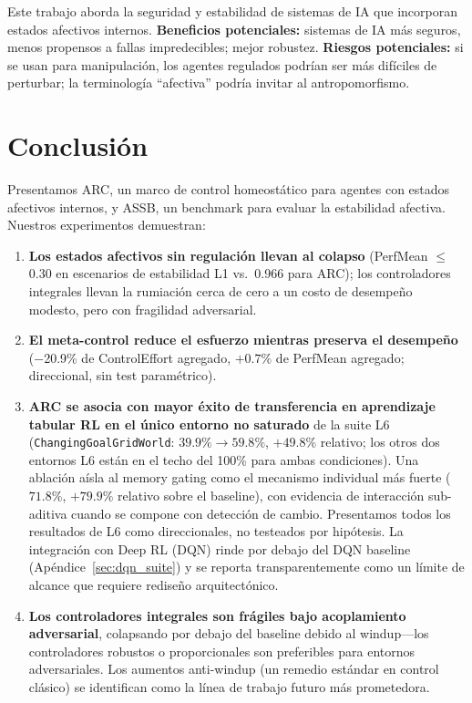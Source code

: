\documentclass{article}
\begin{document}
Este trabajo aborda la seguridad y estabilidad de sistemas de IA que incorporan estados afectivos internos. \textbf{Beneficios potenciales:} sistemas de IA más seguros, menos propensos a fallas impredecibles; mejor robustez. \textbf{Riesgos potenciales:} si se usan para manipulación, los agentes regulados podrían ser más difíciles de perturbar; la terminología ``afectiva'' podría invitar al antropomorfismo.

\section{Conclusión}

Presentamos ARC, un marco de control homeostático para agentes con estados afectivos internos, y ASSB, un benchmark para evaluar la estabilidad afectiva. Nuestros experimentos demuestran:
\begin{enumerate}
    \item \textbf{Los estados afectivos sin regulación llevan al colapso} (PerfMean $\leq$ 0.30 en escenarios de estabilidad L1 vs.\ 0.966 para ARC); los controladores integrales llevan la rumiación cerca de cero a un costo de desempeño modesto, pero con fragilidad adversarial.
    \item \textbf{El meta-control reduce el esfuerzo mientras preserva el desempeño} ($-$20.9\% de ControlEffort agregado, $+0.7\%$ de PerfMean agregado; direccional, sin test paramétrico).
    \item \textbf{ARC se asocia con mayor éxito de transferencia en aprendizaje tabular RL en el único entorno no saturado} de la suite L6 (\texttt{ChangingGoalGridWorld}: $39.9\% \rightarrow 59.8\%$, $+49.8\%$ relativo; los otros dos entornos L6 están en el techo del 100\% para ambas condiciones). Una ablación aísla al memory gating como el mecanismo individual más fuerte ($71.8\%$, $+79.9\%$ relativo sobre el baseline), con evidencia de interacción sub-aditiva cuando se compone con detección de cambio. Presentamos todos los resultados de L6 como direccionales, no testeados por hipótesis. La integración con Deep RL (DQN) rinde por debajo del DQN baseline (Apéndice~\ref{sec:dqn_suite}) y se reporta transparentemente como un límite de alcance que requiere rediseño arquitectónico.
    \item \textbf{Los controladores integrales son frágiles bajo acoplamiento adversarial}, colapsando por debajo del baseline debido al windup---los controladores robustos o proporcionales son preferibles para entornos adversariales. Los aumentos anti-windup (un remedio estándar en control clásico) se identifican como la línea de trabajo futuro más prometedora.
\end{enumerate}
\end{document}

